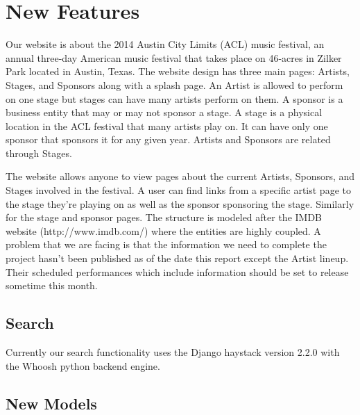 \documentclass[12pt,english]{scrartcl}
\begin{document}
\section{New Features}
Our website is about the 2014 Austin City Limits (ACL) music festival, an annual three-day American music festival that takes place on 46-acres in Zilker Park located in Austin, Texas. 
The website design has three main pages: Artists, Stages, and Sponsors along with a splash page. An Artist is allowed to perform on one stage but stages can have many artists perform on them.
A sponsor is a business entity that may or may not sponsor a stage. A stage is a physical location in the ACL festival that many artists play on. 
It can have only one sponsor that sponsors it for any given year. Artists and Sponsors are related through Stages.

The website allows anyone to view pages about the current Artists, Sponsors, and Stages involved in the festival. A user can find links from a specific artist page to the stage they're playing on
as well as the sponsor sponsoring the stage. Similarly for the stage and sponsor pages. The structure is modeled after the IMDB website (http://www.imdb.com/) where the entities are highly coupled.
A problem that we are facing is that the information we need to complete the project hasn't been published as of the date this report except the Artist lineup. Their scheduled performances which 
include information should be set to release sometime this month.

\subsection{Search}
Currently our search functionality uses the Django haystack version 2.2.0 with the Whoosh python backend engine.
\subsection{New Models}
\end{document}

